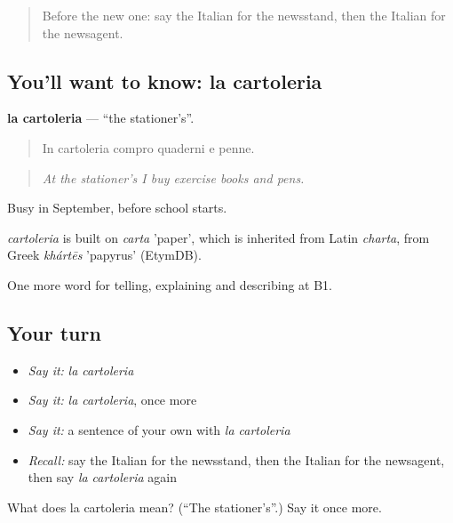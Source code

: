 \label{lesson:IT-C452-cartoleria}



\begin{quote}
Before the new one: say the Italian for the newsstand, then the Italian for the newsagent.
\end{quote}

\subsection*{You'll want to know: la cartoleria}
\textbf{la cartoleria} — \textquotedblleft{}the stationer's\textquotedblright{}.

\begin{quote}
In cartoleria compro quaderni e penne.
\end{quote}

\begin{quote}
\emph{At the stationer's I buy exercise books and pens.}
\end{quote}

Busy in September, before school starts.

\begin{cousinweb}
\emph{cartoleria} is built on \emph{carta} 'paper', which is inherited from Latin \emph{charta}, from Greek \emph{khártēs} 'papyrus' (EtymDB).
\end{cousinweb}

\begin{grammarlens}[title={What you've built}]
One more word for telling, explaining and describing at B1.
\end{grammarlens}

\subsection*{Your turn}
\begin{itemize}
\raggedright
  \item \emph{Say it:} \emph{la cartoleria}
  \item \emph{Say it:} \emph{la cartoleria}, once more
  \item \emph{Say it:} a sentence of your own with \emph{la cartoleria}
  \item \emph{Recall:} say the Italian for the newsstand, then the Italian for the newsagent, then say \emph{la cartoleria} again
\end{itemize}

\begin{tcolorbox}[breakable,colback=teal!4,colframe=teal!35!black,title={Before you move on}]
What does la cartoleria mean? (\textquotedblleft{}The stationer's\textquotedblright{}.) Say it once more.
\end{tcolorbox}
